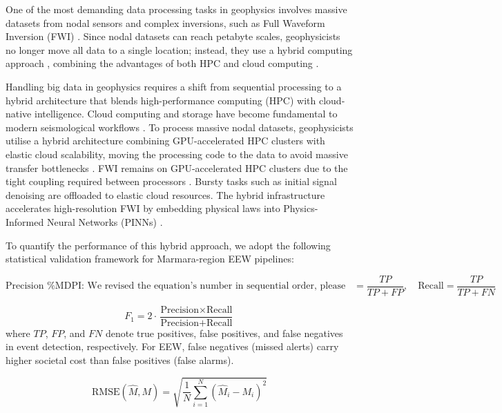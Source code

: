 \documentclass[data,article,accept,pdftex,moreauthors]{Definitions/mdpi}
\begin{document}
One of the most demanding data processing tasks in geophysics involves massive datasets from nodal sensors and complex inversions, such as Full Waveform Inversion (FWI) \cite{xue2024real,witte2019scalable,abdellaziz2024optimal,Virieux2009}. Since nodal datasets can reach petabyte scales, geophysicists no longer move all data to a single location; instead, they use a hybrid computing approach \cite{peter2011forward}, combining the advantages of both HPC and cloud computing \cite{ejarque2022enabling,assuncao2015big}.

Handling big data in geophysics requires a shift from sequential processing to a hybrid architecture that blends high-performance computing (HPC) with cloud-native intelligence. Cloud computing and storage have become fundamental to modern seismological workflows \cite{Parisi2025}. To process massive nodal datasets, geophysicists utilise a hybrid architecture combining GPU-accelerated HPC clusters with elastic cloud scalability, moving the processing code to the data to avoid massive transfer bottlenecks \cite{krauss2023seismology,maccarthy2020seismology}. FWI remains on GPU-accelerated HPC clusters due to the tight coupling required between processors \cite{Brossier2015}. Bursty tasks such as initial signal denoising are offloaded to elastic cloud resources. The hybrid infrastructure accelerates high-resolution FWI by embedding physical laws into Physics-Informed Neural Networks (PINNs) \cite{raissi2019physics,RashtBehesht2022}.

To quantify the performance of this hybrid approach, we adopt the following statistical validation framework for Marmara-region EEW pipelines:

\begin{equation}
\text{Precision %
} = \frac{TP}{TP + FP}, \quad \text{Recall} = \frac{TP}{TP + FN}
\end{equation}

\begin{equation}
F_1 = 2 \cdot \frac{\text{Precision} \times \text{Recall}}{\text{Precision} + \text{Recall}}
\end{equation}
where $TP$, $FP$, and $FN$ denote true positives, false positives, and false negatives in event detection, respectively. For EEW, false negatives (missed alerts) carry higher societal cost than false positives (false alarms).

\begin{equation}
\text{RMSE}(\hat{M}, M) = \sqrt{\frac{1}{N}\sum_{i=1}^{N}(\hat{M}_i - M_i)^2}
\end{equation}
\end{document}
